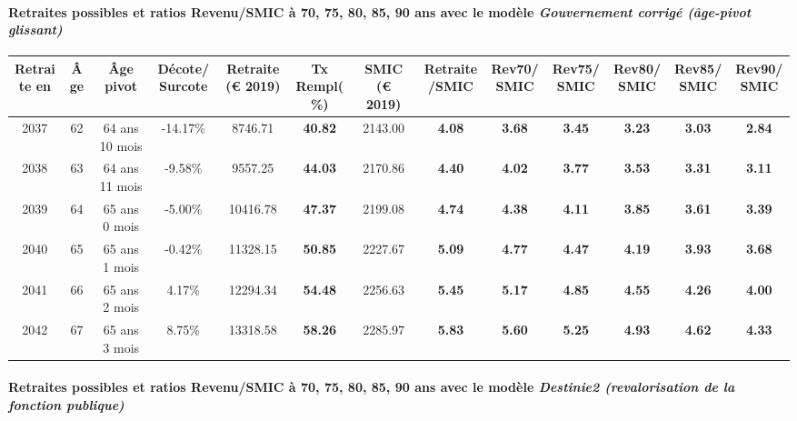 \paragraph{Retraites possibles et ratios Revenu/SMIC à 70, 75, 80, 85, 90 ans avec le modèle \emph{Gouvernement corrigé (âge-pivot glissant)}}  
 
{ \scriptsize \begin{center} 
\begin{tabular}[htb]{|c|c||c|c||c|c||c||c|c|c|c|c|c|} 
\hline 
 Retraite en &  Âge &  Âge pivot &  Décote/Surcote &  Retraite (\euro{} 2019) &  Tx Rempl(\%) &  SMIC (\euro{} 2019) &  Retraite/SMIC &  Rev70/SMIC &  Rev75/SMIC &  Rev80/SMIC &  Rev85/SMIC &  Rev90/SMIC \\ 
\hline \hline 
 2037 &  62 &  64 ans 10 mois &  -14.17\% &  8746.71 &  {\bf 40.82} &  2143.00 &  {\bf 4.08} &  {\bf 3.68} &  {\bf 3.45} &  {\bf 3.23} &  {\bf 3.03} &  {\bf 2.84} \\ 
\hline 
 2038 &  63 &  64 ans 11 mois &  -9.58\% &  9557.25 &  {\bf 44.03} &  2170.86 &  {\bf 4.40} &  {\bf 4.02} &  {\bf 3.77} &  {\bf 3.53} &  {\bf 3.31} &  {\bf 3.11} \\ 
\hline 
 2039 &  64 &  65 ans 0 mois &  -5.00\% &  10416.78 &  {\bf 47.37} &  2199.08 &  {\bf 4.74} &  {\bf 4.38} &  {\bf 4.11} &  {\bf 3.85} &  {\bf 3.61} &  {\bf 3.39} \\ 
\hline 
 2040 &  65 &  65 ans 1 mois &  -0.42\% &  11328.15 &  {\bf 50.85} &  2227.67 &  {\bf 5.09} &  {\bf 4.77} &  {\bf 4.47} &  {\bf 4.19} &  {\bf 3.93} &  {\bf 3.68} \\ 
\hline 
 2041 &  66 &  65 ans 2 mois &  4.17\% &  12294.34 &  {\bf 54.48} &  2256.63 &  {\bf 5.45} &  {\bf 5.17} &  {\bf 4.85} &  {\bf 4.55} &  {\bf 4.26} &  {\bf 4.00} \\ 
\hline 
 2042 &  67 &  65 ans 3 mois &  8.75\% &  13318.58 &  {\bf 58.26} &  2285.97 &  {\bf 5.83} &  {\bf 5.60} &  {\bf 5.25} &  {\bf 4.93} &  {\bf 4.62} &  {\bf 4.33} \\ 
\hline 
\hline 
\end{tabular} 
\end{center} } 
\paragraph{Retraites possibles et ratios Revenu/SMIC à 70, 75, 80, 85, 90 ans avec le modèle \emph{Destinie2 (revalorisation de la fonction publique)}}  
 
